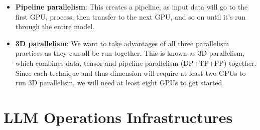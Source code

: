 \begin{itemize}
\begin{itemize}
			\item \textbf{Pipeline parallelism}: This creates a pipeline, as input data will go to the first GPU, process, then transfer to the next GPU, and so on until it's run through the entire model. 
			\item \textbf{3D parallelism}: We want to take advantages of all three parallelism practices as they can all be run together. This is known as 3D parallelism, which combines data, tensor and pipeline parallelism (DP+TP+PP) together. Since each technique and thus dimension will require at least two GPUs to run 3D parallelism, we will need at least eight GPUs to get started. 
		\end{itemize}
\end{itemize}

\section{LLM Operations Infrastructures}
